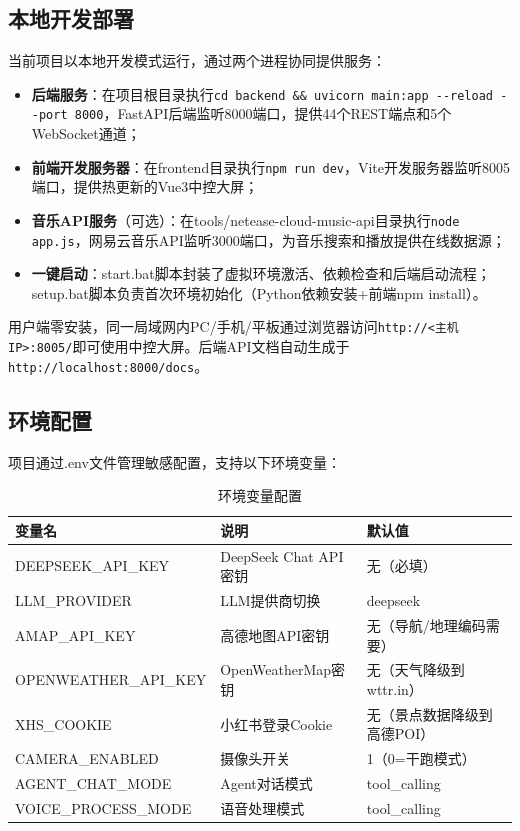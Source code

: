 \documentclass[a4paper]{article}
\begin{document}
\subsection{本地开发部署}

当前项目以本地开发模式运行，通过两个进程协同提供服务：

\begin{itemize}
    \item \textbf{后端服务}：在项目根目录执行\texttt{cd backend \&\& uvicorn main:app -{}-reload -{}-port 8000}，FastAPI后端监听8000端口，提供44个REST端点和5个WebSocket通道；
    \item \textbf{前端开发服务器}：在frontend目录执行\texttt{npm run dev}，Vite开发服务器监听8005端口，提供热更新的Vue3中控大屏；
    \item \textbf{音乐API服务}（可选）：在tools/netease-cloud-music-api目录执行\texttt{node app.js}，网易云音乐API监听3000端口，为音乐搜索和播放提供在线数据源；
    \item \textbf{一键启动}：start.bat脚本封装了虚拟环境激活、依赖检查和后端启动流程；setup.bat脚本负责首次环境初始化（Python依赖安装+前端npm install）。
\end{itemize}

用户端零安装，同一局域网内PC/手机/平板通过浏览器访问\texttt{http://<主机IP>:8005/}即可使用中控大屏。后端API文档自动生成于\texttt{http://localhost:8000/docs}。

\subsection{环境配置}

项目通过.env文件管理敏感配置，支持以下环境变量：

\begin{table}[H]
  \centering
  \caption{环境变量配置}
  \label{tab:env}
  \begin{tabular}{lll}
  \toprule
  变量名 & 说明 & 默认值 \\
  \midrule
  DEEPSEEK\_API\_KEY & DeepSeek Chat API密钥 & 无（必填）\\
  LLM\_PROVIDER & LLM提供商切换 & deepseek \\
  AMAP\_API\_KEY & 高德地图API密钥 & 无（导航/地理编码需要）\\
  OPENWEATHER\_API\_KEY & OpenWeatherMap密钥 & 无（天气降级到wttr.in）\\
  XHS\_COOKIE & 小红书登录Cookie & 无（景点数据降级到高德POI）\\
  CAMERA\_ENABLED & 摄像头开关 & 1（0=干跑模式）\\
  AGENT\_CHAT\_MODE & Agent对话模式 & tool\_calling \\
  VOICE\_PROCESS\_MODE & 语音处理模式 & tool\_calling \\
  \bottomrule
  \end{tabular}
\end{table}
\end{document}
